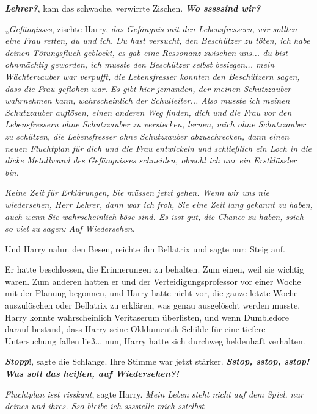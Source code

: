 \glqq{}\textbf{\emph{Lehrer?}}\grqq{}, kam das schwache, verwirrte Zischen.
\textbf{\emph{\glqq{}Wo sssssind wir?\grqq{}} }

„\emph{Gefängissss}\grqq{}, zischte Harry, \glqq{}\emph{das Gefängnis mit den
Lebensfressern, wir sollten eine Frau retten, du und ich. Du hast versucht, den
Beschützer zu töten, ich habe deinen Tötungsfluch geblockt, es gab eine
Ressonanz zwischen uns... du bist ohnmächtig geworden, ich musste den Beschützer
selbst besiegen... mein Wächterzauber war verpufft, die Lebensfresser konnten
den Beschützern sagen, dass die Frau geflohen war.} \emph{Es gibt hier jemanden,
der meinen Schutzzauber wahrnehmen kann,} \emph{wahrscheinlich der
Schulleiter... Also musste ich meinen Schutzzauber auflösen, einen anderen Weg
finden, dich und die Frau vor den Lebensfressern ohne Schutzzauber zu
verstecken, lernen, mich ohne Schutzzauber zu schützen, die Lebensfresser ohne
Schutzzauber abzuschrecken, dann einen neuen Fluchtplan für dich und die Frau
entwickeln und schließlich ein Loch in die dicke Metallwand des Gefängnisses
schneiden, obwohl ich nur ein Erstklässler bin.}

\emph{Keine Zeit für Erklärungen, Sie müssen jetzt gehen. Wenn wir uns nie
wiedersehen, Herr Lehrer, dann war ich froh, Sie eine Zeit lang gekannt zu
haben, auch wenn Sie wahrscheinlich böse sind. Es isst gut, die Chance zu haben,
ssich so viel zu sagen: Auf Wiedersehen.}\grqq{}

Und Harry nahm den Besen, reichte ihn Bellatrix und sagte nur: \glqq{}Steig auf.\grqq{}

Er hatte beschlossen, die Erinnerungen zu behalten. Zum einen, weil sie wichtig
waren. Zum anderen hatten er und der Verteidigungsprofessor vor einer Woche mit
der Planung begonnen, und Harry hatte nicht vor, die ganze letzte Woche
auszulöschen oder Bellatrix zu erklären, was genau ausgelöscht werden musste.
Harry konnte wahrscheinlich Veritaserum überlisten, und wenn Dumbledore darauf
bestand, dass Harry seine Okklumentik-Schilde für eine tiefere Untersuchung
fallen ließ... nun, Harry hatte sich durchweg heldenhaft verhalten.

\glqq{}\textbf{\emph{Stopp}}!\grqq{}, sagte die Schlange. Ihre Stimme war jetzt
stärker. \glqq{}\textbf{\emph{Sstop, sstop, sstop! Was soll das heißen, auf
Wiedersehen?!}}\grqq{}

\glqq{}\emph{Fluchtplan isst risskant}\grqq{}, sagte Harry. \glqq{}\emph{Mein
Leben steht nicht auf dem Spiel, nur deines und ihres. Sso bleibe ich sssstelle
mich sstelbst -}\grqq{}

